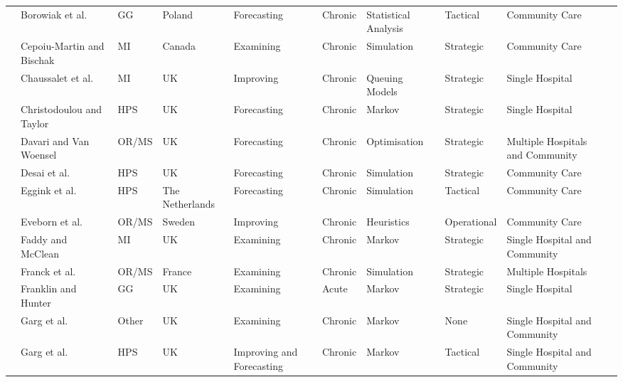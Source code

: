 \documentclass[thesis.tex]{subfiles}
\begin{document}
\begin{landscape}
\begin{table}[H]
{\begin{tabular}{@{}llllllllll@{}}
  \cite{Borowiak} & Borowiak et al. &GG & Poland & Forecasting & Chronic &Statistical Analysis & Tactical & Community Care \\
  \cite{Cepoiu} & Cepoiu-Martin and Bischak & MI & Canada & Examining & Chronic & Simulation& Strategic & Community Care \\
 \cite{Chaussalet} & Chaussalet et al. & MI & UK & Improving& Chronic & Queuing Models & Strategic & Single Hospital \\
 \cite{Christodoulou} & Christodoulou and Taylor & HPS &UK & Forecasting &Chronic & Markov&Strategic &Single Hospital\\
  \cite{Davari} & Davari and Van Woensel & OR/MS  &UK& Forecasting &Chronic &Optimisation &Strategic & Multiple Hospitals and Community \\
  \cite{Desai} & Desai et al. & HPS  & UK & Forecasting & Chronic &Simulation & Strategic & Community Care\\
  \cite{Eggink} & Eggink et al. & HPS & The Netherlands & Forecasting & Chronic & Simulation & Tactical & Community Care\\
  \cite{Eveborn} & Eveborn et al. & OR/MS & Sweden & Improving& Chronic & Heuristics & Operational & Community Care\\
  \cite{Faddy} & Faddy and McClean & MI & UK & Examining & Chronic & Markov &Strategic &Single Hospital and Community\\
  \cite{Franck} & Franck et al. & OR/MS & France & Examining & Chronic & Simulation & Strategic & Multiple Hospitals \\
  \cite{Franklin} & Franklin and Hunter & GG & UK & Examining &Acute & Markov & Strategic&Single Hospital \\

  \cite{Garg1} & Garg et al. & Other & UK & Examining & Chronic & Markov & None & Single Hospital and Community \\
  \cite{Garg2} & Garg et al. & HPS & UK& Improving and Forecasting& Chronic & Markov&Tactical &Single Hospital and Community\\ 
  

\end{tabular}}
\end{table}
\end{landscape}
\end{document}

